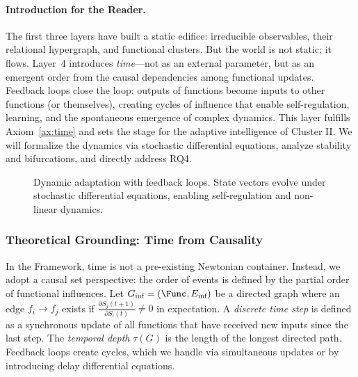 \paragraph{Introduction for the Reader.}
The first three layers have built a static edifice: irreducible observables, their relational hypergraph, and functional clusters. But the world is not static; it flows. Layer~4 introduces \emph{time}—not as an external parameter, but as an emergent order from the causal dependencies among functional updates. Feedback loops close the loop: outputs of functions become inputs to other functions (or themselves), creating cycles of influence that enable self-regulation, learning, and the spontaneous emergence of complex dynamics. This layer fulfills Axiom~\ref{ax:time} and sets the stage for the adaptive intelligence of Cluster II. We will formalize the dynamics via stochastic differential equations, analyze stability and bifurcations, and directly address RQ4.

\begin{figure}[htbp]
    \centering
    \caption{Dynamic adaptation with feedback loops. State vectors evolve under stochastic differential equations, enabling self-regulation and non-linear dynamics.}
    \label{fig:layer4}
\end{figure}

\subsubsection{Theoretical Grounding: Time from Causality}
In the \Apeiron{} Framework, time is not a pre-existing Newtonian container. Instead, we adopt a causal set perspective: the order of events is defined by the partial order of functional influences. Let $G_{\text{inf}} = (\Func, E_{\text{inf}})$ be a directed graph where an edge $f_i \to f_j$ exists if $\frac{\partial S_j(t+1)}{\partial S_i(t)} \neq 0$ in expectation. A \emph{discrete time step} is defined as a synchronous update of all functions that have received new inputs since the last step. The \emph{temporal depth} $\tau(G)$ is the length of the longest directed path. Feedback loops create cycles, which we handle via simultaneous updates or by introducing delay differential equations.

